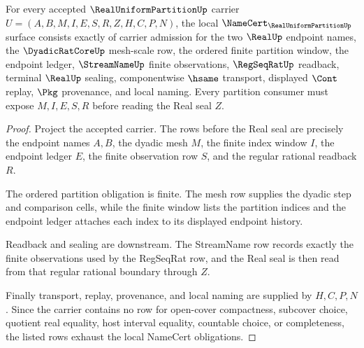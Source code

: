 \begin{theorem}
\label{thm:real-uniform-partition-namecert-obligations}
For every accepted $\RealUniformPartitionUp$ carrier $U=(A,B,M,I,E,S,R,Z,H,C,P,N)$, the local $\NameCert_{\RealUniformPartitionUp}$ surface consists exactly of carrier admission for the two $\RealUp$ endpoint names, the $\DyadicRatCoreUp$ mesh-scale row, the ordered finite partition window, the endpoint ledger, $\StreamNameUp$ finite observations, $\RegSeqRatUp$ readback, terminal $\RealUp$ sealing, componentwise $\hsame$ transport, displayed $\Cont$ replay, $\Pkg$ provenance, and local naming. Every partition consumer must expose $M,I,E,S,R$ before reading the Real seal $Z$.
\end{theorem}
\begin{proof}
Project the accepted carrier. The rows before the Real seal are precisely the endpoint names $A,B$, the dyadic mesh $M$, the finite index window $I$, the endpoint ledger $E$, the finite observation row $S$, and the regular rational readback $R$.

The ordered partition obligation is finite. The mesh row supplies the dyadic step and comparison cells, while the finite window lists the partition indices and the endpoint ledger attaches each index to its displayed endpoint history.

Readback and sealing are downstream. The StreamName row records exactly the finite observations used by the RegSeqRat row, and the Real seal is then read from that regular rational boundary through $Z$.

Finally transport, replay, provenance, and local naming are supplied by $H,C,P,N$. Since the carrier contains no row for open-cover compactness, subcover choice, quotient real equality, host interval equality, countable choice, or completeness, the listed rows exhaust the local NameCert obligations.
\end{proof}

